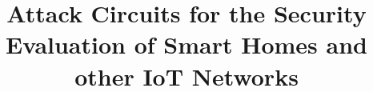 \documentclass[10pt, conference]{IEEEtran}
\begin{document}
%
\title{Attack Circuits for the Security Evaluation of Smart Homes and other IoT Networks}


\author{ }

\maketitle




%
%



\end{document}
